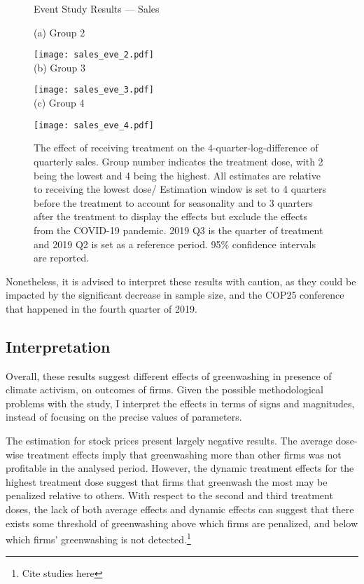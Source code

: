 \documentclass[12pt]{article}
\begin{document}
\begin{figure}
    \caption{Event Study Results --- Sales}
    \centering
    
    (a) Group 2
    
    \texttt{[image: sales\_eve\_2.pdf]} \\
    
    (b) Group 3
    
    \texttt{[image: sales\_eve\_3.pdf]} \\
    
    (c) Group 4
    
    \texttt{[image: sales\_eve\_4.pdf]}
    
    \captionsetup{font=footnotesize}
    \caption*{The effect of receiving treatment on the 4-quarter-log-difference of quarterly sales. Group number indicates the treatment dose, with 2 being the lowest and 4 being the highest. All estimates are relative to receiving the lowest dose/ Estimation window is set to 4 quarters before the treatment to account for seasonality and to 3 quarters after the treatment to display the effects but exclude the effects from the COVID-19 pandemic. 2019 Q3 is the quarter of treatment and 2019 Q2 is set as a reference period. 95\% confidence intervals are reported.}
\end{figure}

Nonetheless, it is advised to interpret these results with caution, as they could be impacted by the significant decrease in sample size, and the COP25 conference that happened in the fourth quarter of 2019. 



\subsection{Interpretation}

Overall, these results suggest different effects of greenwashing in presence of climate activism, on outcomes of firms. Given the possible methodological problems with the study, I interpret the effects in terms of signs and magnitudes, instead of focusing on the precise values of parameters.

The estimation for stock prices present largely negative results. The average dose-wise treatment effects imply that greenwashing more than other firms was not profitable in the analysed period. However, the dynamic treatment effects for the highest treatment dose suggest that firms that greenwash the most may be penalized relative to others. With respect to the second and third treatment doses, the lack of both average effects and dynamic effects can suggest that there exists some threshold of greenwashing above which firms are penalized, and below which firms' greenwashing is not detected.\footnote{Cite studies here} 
\end{document}
